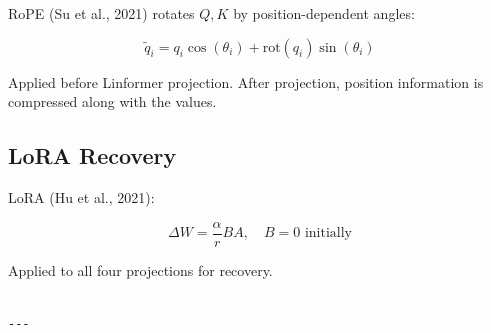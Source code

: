 RoPE (Su et al., 2021) rotates $Q, K$ by position-dependent angles:

\[
\tilde{q}_i = q_i \cos(\theta_i) + \text{rot}(q_i) \sin(\theta_i)
\tag{3.9}
\]

Applied before Linformer projection. After projection, position information 
is compressed along with the values.

\subsection{LoRA Recovery}

LoRA (Hu et al., 2021):

\[
\Delta W = \frac{\alpha}{r} B A, \quad B = 0 \text{ initially}
\tag{3.10}
\]

Applied to all four projections for recovery.
\begin{lstlisting}

---
\end{lstlisting}